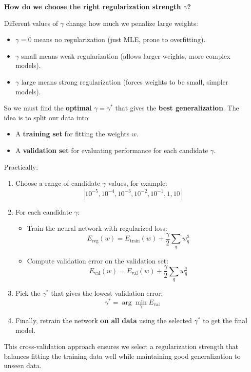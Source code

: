 \highspace
\begin{flushleft}
    \textcolor{Green3}{ \textbf{How do we choose the right regularization strength $\gamma$?}}
\end{flushleft}
Different values of $\gamma$ change how much we penalize large weights:
\begin{itemize}
    \item $\gamma = 0$ means no regularization (just MLE, prone to overfitting).
    \item $\gamma$ small means weak regularization (allows larger weights, more complex models).
    \item $\gamma$ large means strong regularization (forces weights to be small, simpler models).
\end{itemize}
So we must find the \textbf{optimal} $\gamma = \gamma^*$ that gives the \textbf{best generalization}. The idea is to split our data into:
\begin{itemize}
    \item A \textbf{training set} for fitting the weights $w$.
    \item A \textbf{validation set} for evaluating performance for each candidate $\gamma$.
\end{itemize}
Practically:
\begin{enumerate}
    \item Choose a range of candidate $\gamma$ values, for example:
    \begin{equation*}
        \left|
            10^{-5}, 10^{-4}, 10^{-3}, 10^{-2}, 10^{-1}, 1, 10
        \right|
    \end{equation*}
    \item For each candidate $\gamma$:
    \begin{itemize}
        \item Train the neural network with regularized loss:
        \begin{equation*}
            E_{\text{reg}}(w) = E_{\text{train}}(w) + \dfrac{\gamma}{2} \sum_{q} w_q^2
        \end{equation*}
        \item Compute validation error on the validation set:
        \begin{equation*}
            E_{\text{val}}(w) = E_{\text{val}}(w) + \dfrac{\gamma}{2} \sum_{q} w_q^2
        \end{equation*}
    \end{itemize}
    \item Pick the $\gamma^*$ that gives the lowest validation error:
    \begin{equation}
        \gamma^* = \arg\min_{\gamma} E_{\text{val}}
    \end{equation}
    \item Finally, retrain the network \textbf{on all data} using the selected $\gamma^*$ to get the final model.
\end{enumerate}
This cross-validation approach ensures we select a regularization strength that balances fitting the training data well while maintaining good generalization to unseen data.